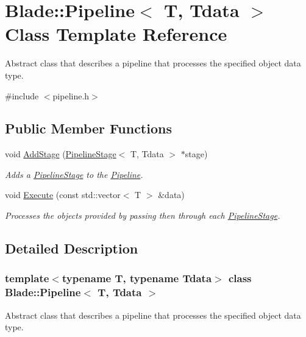 \hypertarget{class_blade_1_1_pipeline}{}\section{Blade\+:\+:Pipeline$<$ T, Tdata $>$ Class Template Reference}
\label{class_blade_1_1_pipeline}


Abstract class that describes a pipeline that processes the specified object data type.  




{\ttfamily \#include $<$pipeline.\+h$>$}

\subsection*{Public Member Functions}
\begin{DoxyCompactItemize}
\item 
void \hyperlink{class_blade_1_1_pipeline_a9fb99991044731f11512623dee4f1879}{Add\+Stage} (\hyperlink{class_blade_1_1_pipeline_stage}{Pipeline\+Stage}$<$ T, Tdata $>$ $\ast$stage)
\begin{DoxyCompactList}\small\item\em Adds a \hyperlink{class_blade_1_1_pipeline_stage}{Pipeline\+Stage} to the \hyperlink{class_blade_1_1_pipeline}{Pipeline}. \end{DoxyCompactList}\item 
void \hyperlink{class_blade_1_1_pipeline_a582e7f781de9f923a0c20a48019fb24f}{Execute} (const std\+::vector$<$ T $>$ \&data)
\begin{DoxyCompactList}\small\item\em Processes the objects provided by passing then through each \hyperlink{class_blade_1_1_pipeline_stage}{Pipeline\+Stage}. \end{DoxyCompactList}\end{DoxyCompactItemize}


\subsection{Detailed Description}
\subsubsection*{template$<$typename T, typename Tdata$>$\newline
class Blade\+::\+Pipeline$<$ T, Tdata $>$}

Abstract class that describes a pipeline that processes the specified object data type. 


